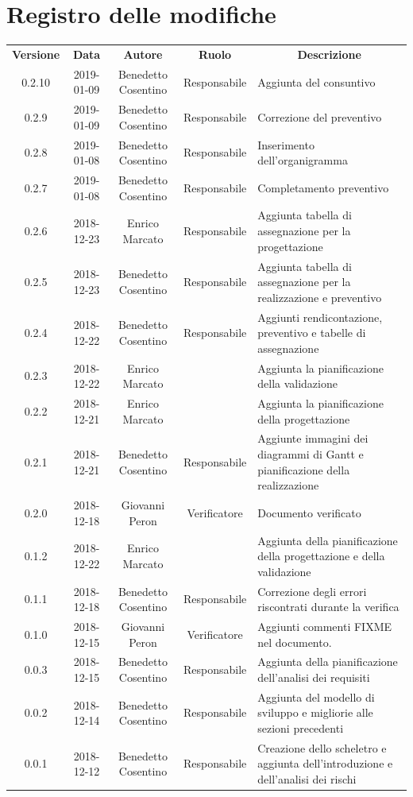 \documentclass[11pt,a4paper]{article}
\begin{document}
	
	
	\newpage
	\section*{\centering Registro delle modifiche}
	\begin{tabularx}{\textwidth}{ c | c | c | c | X }
		\rowcolor{LightBlue}
		\color{white}\bfseries Versione & 
		\color{white}\bfseries Data & 
		\color{white}\bfseries Autore & 
		\color{white}\bfseries Ruolo & 
		\multicolumn{1}{c}{\color{white}\bfseries Descrizione}\\[0.25cm]

		0.2.10 & 2019-01-09 & Benedetto Cosentino & Responsabile & Aggiunta del consuntivo\\
		0.2.9 & 2019-01-09 & Benedetto Cosentino & Responsabile & Correzione del preventivo\\
		0.2.8 & 2019-01-08 & Benedetto Cosentino & Responsabile & Inserimento dell'organigramma \\
		0.2.7 & 2019-01-08 & Benedetto Cosentino & Responsabile & Completamento preventivo \\		
		0.2.6 & 2018-12-23 & Enrico Marcato & Responsabile & Aggiunta tabella di assegnazione per la progettazione\\
		0.2.5 & 2018-12-23 & Benedetto Cosentino & Responsabile & Aggiunta tabella di assegnazione per la realizzazione e preventivo\\
		0.2.4 & 2018-12-22 & Benedetto Cosentino & Responsabile & Aggiunti rendicontazione, preventivo e tabelle di assegnazione \\
		0.2.3 & 2018-12-22 & Enrico Marcato &  & Aggiunta la pianificazione della validazione\\
		0.2.2 & 2018-12-21 & Enrico Marcato &  & Aggiunta la pianificazione della progettazione\\
		0.2.1 & 2018-12-21 & Benedetto Cosentino & Responsabile & Aggiunte immagini dei diagrammi di Gantt e pianificazione della realizzazione\\
		0.2.0 & 2018-12-18 & Giovanni Peron & Verificatore & Documento verificato\\
		0.1.2 & 2018-12-22 & Enrico Marcato &  & Aggiunta della pianificazione della progettazione e della validazione\\
		0.1.1 & 2018-12-18 & Benedetto Cosentino & Responsabile & Correzione degli errori riscontrati durante la verifica\\
		0.1.0 & 2018-12-15 & Giovanni Peron & Verificatore & Aggiunti commenti FIXME nel documento.\\
		0.0.3 & 2018-12-15 & Benedetto Cosentino & Responsabile & Aggiunta della pianificazione dell'analisi dei requisiti\\
		0.0.2 & 2018-12-14 & Benedetto Cosentino & Responsabile & Aggiunta del modello di sviluppo e migliorie alle sezioni precedenti\\
		0.0.1 & 2018-12-12 & Benedetto Cosentino & Responsabile & Creazione dello scheletro e aggiunta dell'introduzione e dell'analisi dei rischi\\
	\end{tabularx}
	\newpage
	\tableofcontents
	\newpage	
\end{document}
